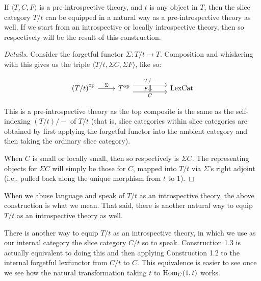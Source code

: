 \begin{construction}
If $\langle T, C, F \rangle$ is a pre-introspective theory, and $t$ is any object in $T$, then the slice category $T/t$ can be equipped in a natural way as a pre-introspective theory as well. If we start from an introspective or locally introspective theory, then so respectively will be the result of this construction.
\end{construction}
\begin{proof}[Details]
Consider the forgetful functor $\Sigma : T/t \to T$. Composition and whiskering with this gives us the triple $\langle T/t, \Sigma C, \Sigma F \rangle$, like so:

\[\begin{tikzcd}
	{\op{\left(T/t\right)}} & {\op{T}} && {\LexCat}
	\arrow["{T/-}"{name=0}, from=1-2, to=1-4, shift left=2]
	\arrow["{C}"{name=1, swap}, from=1-2, to=1-4, shift right=2]
	\arrow["{\Sigma}", from=1-1, to=1-2]
	\arrow[Rightarrow, "{F}"', from=0, to=1]
\end{tikzcd}\]

This is a pre-introspective theory as the top composite is the same as the self-indexing $(T/t)/-$ of $T/t$ (that is, slice categories within slice categories are obtained by first applying the forgetful functor into the ambient category and then taking the ordinary slice category).

When $C$ is small or locally small, then so respectively is $\Sigma C$. The representing objects for $\Sigma C$ will simply be those for $C$, mapped into $T/t$ via $\Sigma$'s right adjoint (i.e., pulled back along the unique morphism from $t$ to $1$).
\end{proof}

When we abuse language and speak of $T/t$ as an introspective theory, the above construction is what we mean. That said, there is another natural way to equip $T/t$ as an introspective theory as well.

\begin{TODOblock}
There is another way to equip $T/t$ as an introspective theory, in which we use as our internal category the slice category $C/t$ so to speak. Construction 1.3 is actually equivalent to doing this and then applying Construction 1.2 to the internal forgetful lexfunctor from $C/t$ to $C$. This equivalence is easier to see once we see how the natural transformation taking $t$ to $\mathrm{Hom}_C(1, t)$ works.
\end{TODOblock}

